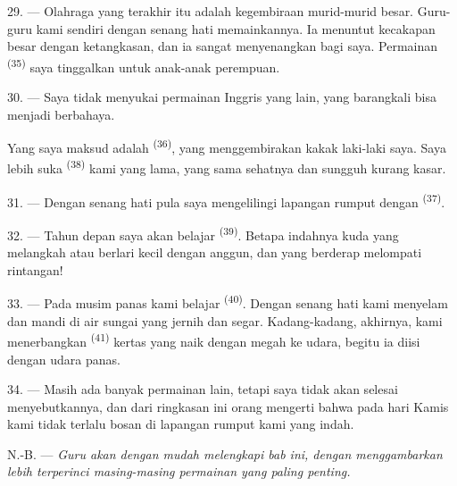 29. --- Olahraga yang terakhir itu adalah kegembiraan murid-murid
besar. Guru-guru kami sendiri dengan senang hati memainkannya. Ia
menuntut kecakapan besar dengan ketangkasan, dan ia sangat
menyenangkan bagi saya. Permainan \textsuperscript{(35)}
saya tinggalkan untuk anak-anak perempuan.

30. --- Saya tidak menyukai permainan Inggris yang lain, yang barangkali
bisa menjadi berbahaya.

Yang saya maksud adalah \textsuperscript{(36)}, yang
menggembirakan kakak laki-laki saya. Saya lebih suka
\textsuperscript{(38)} kami yang lama, yang
sama sehatnya dan sungguh kurang kasar.

\VUsaut{4.6mm}
\VUsaut{3.0mm}

31. --- Dengan senang hati pula saya mengelilingi lapangan rumput
dengan \textsuperscript{(37)}.

32. --- Tahun depan saya akan belajar \textsuperscript{(39)}. Betapa indahnya kuda yang melangkah atau
berlari kecil dengan anggun, dan yang berderap melompati rintangan!

33. --- Pada musim panas kami belajar \textsuperscript{(40)}.
Dengan senang hati kami menyelam dan mandi di air sungai yang jernih
dan segar. Kadang-kadang, akhirnya, kami menerbangkan
\textsuperscript{(41)} kertas yang naik dengan megah ke
udara, begitu ia diisi dengan udara panas.

34. --- Masih ada banyak permainan lain, tetapi saya tidak akan
selesai menyebutkannya, dan dari ringkasan ini orang mengerti bahwa
pada hari Kamis kami tidak terlalu bosan di lapangan rumput kami yang
indah.

N.-B. --- \textit{Guru akan dengan mudah melengkapi bab ini, dengan
menggambarkan lebih terperinci masing-masing permainan yang paling
penting.}

\VUsaut{6.0mm}
\VUfilet{22mm}
